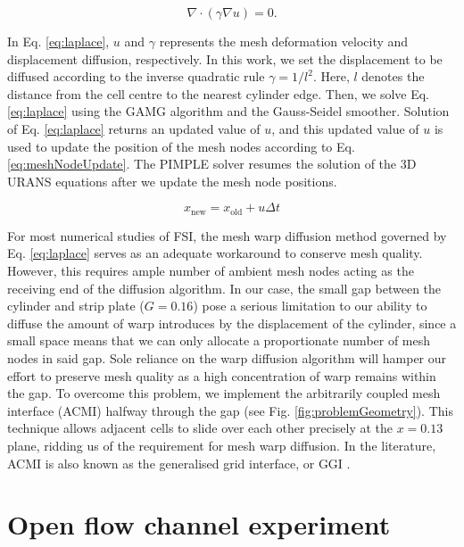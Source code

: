 \documentclass[oneside]{utmthesis}
\begin{document}
\begin{equation}
  \nabla \cdot \left( \gamma \nabla u \right) = 0.
  \label{eq:laplace}
\end{equation}

In Eq. \ref{eq:laplace}, $u$ and $\gamma$ represents the mesh deformation velocity and displacement diffusion, respectively. In this work, we set the displacement to be diffused according to the inverse quadratic rule $\gamma = 1/l^{2}$. Here, $l$ denotes the distance from the cell centre to the nearest cylinder edge. Then, we solve Eq. \ref{eq:laplace} using the GAMG algorithm and the Gauss-Seidel smoother. Solution of Eq. \ref{eq:laplace} returns an updated value of $u$, and this updated value of $u$ is used to update the position of the mesh nodes according to Eq. \ref{eq:meshNodeUpdate}. The PIMPLE solver resumes the solution of the 3D URANS equations after we update the mesh node positions.

\begin{equation}
  x_{\text{new}} = x_{\text{old}} + u \Delta t
  \label{eq:meshNodeUpdate}
\end{equation}

For most numerical studies of FSI, the mesh warp diffusion method governed by Eq. \ref{eq:laplace} serves as an adequate workaround to conserve mesh quality. However, this requires ample number of ambient mesh nodes acting as the receiving end of the diffusion algorithm. In our case, the small gap between the cylinder and strip plate ($G = 0.16$) pose a serious limitation to our ability to diffuse the amount of warp introduces by the displacement of the cylinder, since a small space means that we can only allocate a proportionate number of mesh nodes in said gap. Sole reliance on the warp diffusion algorithm will hamper our effort to preserve mesh quality as a high concentration of warp remains within the gap. To overcome this problem, we implement the arbitrarily coupled mesh interface (ACMI) halfway through the gap (see Fig. \ref{fig:problemGeometry}). This technique allows adjacent cells to slide over each other precisely at the $x = 0.13$ plane, ridding us of the requirement for mesh warp diffusion. In the literature, ACMI is also known as the generalised grid interface, or GGI \citep{Zhang2018,Sun2019b}.

\section{Open flow channel experiment} \label{sec:openFlowExp}
\end{document}
